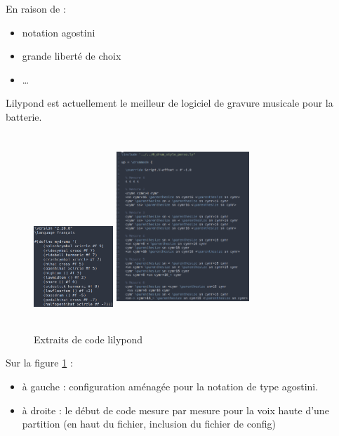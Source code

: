 En raison de :
\begin{itemize}
    \item notation agostini
    \item grande liberté de choix
    \item …
\end{itemize}

Lilypond est actuellement le meilleur de logiciel de gravure musicale pour la
batterie.

\begin{figure}[h]
    \centering
    \includegraphics[height=40mm, width=30mm]{
    z_images/3_methodes/transcription_manuelle/drum_perso_1}
    \includegraphics[height=70mm, width=50mm]{
    z_images/3_methodes/transcription_manuelle/extrait_code.png}
    \caption{Extraits de code lilypond}
    \label{extrait_code}
\end{figure}

Sur la figure \ref{extrait_code} :
\begin{itemize}
    \item à gauche : configuration aménagée pour la notation de type agostini.
    \item à droite : le début de code mesure par mesure pour la voix haute
        d’une partition (en haut du fichier, inclusion du fichier de config)
\end{itemize}

